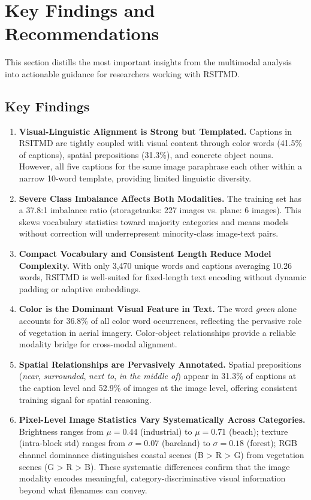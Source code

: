 \section{Key Findings and Recommendations}

This section distills the most important insights from the multimodal analysis into actionable guidance for researchers working with RSITMD.

\subsection{Key Findings}

\begin{enumerate}
    \item \textbf{Visual-Linguistic Alignment is Strong but Templated.} Captions in RSITMD are tightly coupled with visual content through color words (41.5\% of captions), spatial prepositions (31.3\%), and concrete object nouns. However, all five captions for the same image paraphrase each other within a narrow 10-word template, providing limited linguistic diversity.

    \item \textbf{Severe Class Imbalance Affects Both Modalities.} The training set has a 37.8:1 imbalance ratio (storagetanks: 227 images vs. plane: 6 images). This skews vocabulary statistics toward majority categories and means models without correction will underrepresent minority-class image-text pairs.

    \item \textbf{Compact Vocabulary and Consistent Length Reduce Model Complexity.} With only 3,470 unique words and captions averaging 10.26 words, RSITMD is well-suited for fixed-length text encoding without dynamic padding or adaptive embeddings.

    \item \textbf{Color is the Dominant Visual Feature in Text.} The word \textit{green} alone accounts for 36.8\% of all color word occurrences, reflecting the pervasive role of vegetation in aerial imagery. Color-object relationships provide a reliable modality bridge for cross-modal alignment.

    \item \textbf{Spatial Relationships are Pervasively Annotated.} Spatial prepositions (\textit{near}, \textit{surrounded}, \textit{next to}, \textit{in the middle of}) appear in 31.3\% of captions at the caption level and 52.9\% of images at the image level, offering consistent training signal for spatial reasoning.

    \item \textbf{Pixel-Level Image Statistics Vary Systematically Across Categories.} Brightness ranges from $\mu=0.44$ (industrial) to $\mu=0.71$ (beach); texture (intra-block std) ranges from $\sigma=0.07$ (bareland) to $\sigma=0.18$ (forest); RGB channel dominance distinguishes coastal scenes (B > R > G) from vegetation scenes (G > R > B). These systematic differences confirm that the image modality encodes meaningful, category-discriminative visual information beyond what filenames can convey.
\end{enumerate}


